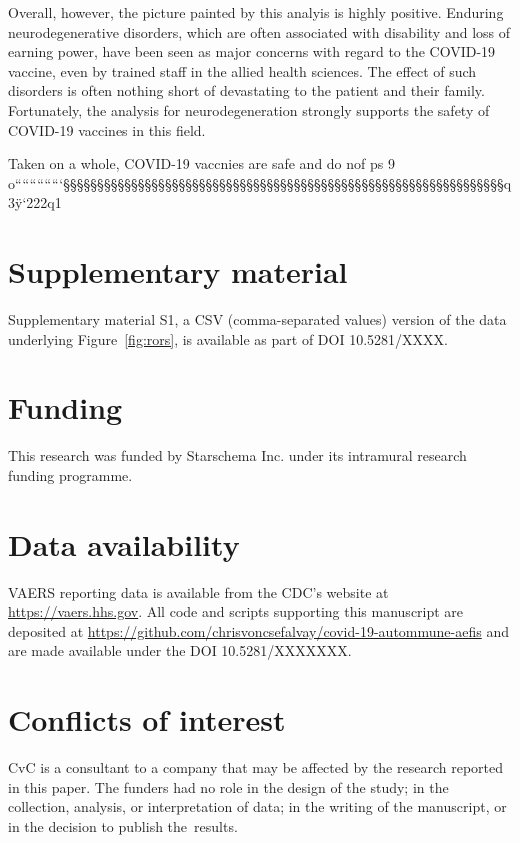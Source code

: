 \documentclass{article}
\begin{document}
Overall, however, the picture painted by this analyis is highly positive.
Enduring neurodegenerative disorders, which are often associated with disability and loss of earning power, have been seen as major concerns with regard to the COVID-19 vaccine, even by trained staff in the allied health sciences.\cite{berry2021lessons}
The effect of such disorders is often nothing short of devastating to the patient and their family.
Fortunately, the analysis for neurodegeneration strongly supports the safety of COVID-19 vaccines in this field.

Taken on a whole, COVID-19 vaccnies are safe and do nof ps  9  o`````````````§§§§§§§§§§§§§§§§§§§§§§§§§§§§§§§§§§§§§§§§§§§§§§§§§§§§§§§§§§§§§§§§§q3ÿ`222q1



\vspace{6pt}

\section*{Supplementary material}

Supplementary material S1, a CSV (comma-separated values) version of the data underlying Figure~\ref{fig:rors}, is available as part of DOI 10.5281/XXXX.

\section*{Funding}

This research was funded by Starschema Inc. under its intramural research funding programme.

\section*{Data availability}

VAERS reporting data is available from the CDC's website at \url{https://vaers.hhs.gov}.
All code and scripts supporting this manuscript are deposited at
\url{https://github.com/chrisvoncsefalvay/covid-19-autommune-aefis} and are made available under the DOI 10.5281/XXXXXXX.

\section*{Conflicts of interest}

CvC is a consultant to a company that may be affected by the research reported in this paper.
The funders had no role in the design of the study;
in the collection, analysis, or interpretation of data;
in the writing of the manuscript, or in the decision to publish the~results.


\end{document}
